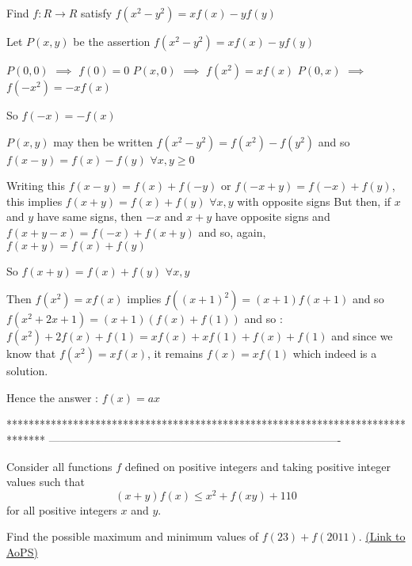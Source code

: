 \begin{solution}
	\begin{tcolorbox}Find $f : R \to R $ satisfy $f(x^2-y^2)=xf(x)-yf(y)$\end{tcolorbox}
Let $P(x,y)$ be the assertion $f(x^2-y^2)=xf(x)-yf(y)$

$P(0,0)$ $\implies$ $f(0)=0$
$P(x,0)$ $\implies$ $f(x^2)=xf(x)$
$P(0,x)$ $\implies$ $f(-x^2)=-xf(x)$ 

So $f(-x)=-f(x)$

$P(x,y)$ may then be written $f(x^2-y^2)=f(x^2)-f(y^2)$ and so $f(x-y)=f(x)-f(y)$ $\forall x,y\ge 0$

Writing this $f(x-y)=f(x)+f(-y)$ or $f(-x+y)=f(-x)+f(y)$, this implies $f(x+y)=f(x)+f(y)$ $\forall x,y$ with opposite signs
But then, if $x$ and $y$ have same signs, then $-x$ and $x+y$ have opposite signs and $f(x+y-x)=f(-x)+f(x+y)$ and so, again, $f(x+y)=f(x)+f(y)$

So $f(x+y)=f(x)+f(y)$ $\forall x,y$

Then $f(x^2)=xf(x)$ implies $f((x+1)^2)=(x+1)f(x+1)$ and so $f(x^2+2x+1)=(x+1)(f(x)+f(1))$ and so :
$f(x^2)+2f(x)+f(1)=xf(x)+xf(1)+f(x)+f(1)$ and since we know that $f(x^2)=xf(x)$, it remains $f(x)=xf(1)$ which indeed is a solution.

Hence the answer : $\boxed{f(x)=ax}$
\end{solution}
*******************************************************************************
-------------------------------------------------------------------------------

\begin{problem}
	Consider all functions $ f$ defined on positive integers and taking positive integer values such that
\[(x+y)f(x)\leq x^2+f(xy)+110\] for all positive integers $x$ and $y$. 

Find the possible maximum and minimum values of $f(23)+f(2011)$.
	\flushright \href{https://artofproblemsolving.com/community/c6h385793}{(Link to AoPS)}
\end{problem}



